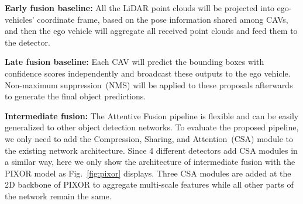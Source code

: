 \noindent\textbf{Early fusion baseline: }All the LiDAR point clouds will be projected into ego-vehicles' coordinate frame, based on the pose information shared among CAVs, and then the ego vehicle will aggregate all received point clouds and feed them to the detector.

\noindent\textbf{Late fusion baseline: } Each CAV will predict the bounding boxes with confidence scores independently and broadcast these outputs to the ego vehicle. Non-maximum suppression~(NMS) will be applied to these proposals afterwards to generate the final object predictions.

\noindent\textbf{Intermediate fusion: }The Attentive Fusion pipeline is flexible and can be easily generalized to other object detection networks. To evaluate the proposed pipeline, we only need to add the Compression, Sharing, and Attention~(CSA) module to the existing network architecture. Since 4 different detectors add CSA modules in a similar way, here we only show the architecture of intermediate fusion with the PIXOR model as Fig.~\ref{fig:pixor} displays.  Three CSA modules are added at the 2D backbone of PIXOR to aggregate multi-scale features while all other parts of the network remain the same. 

